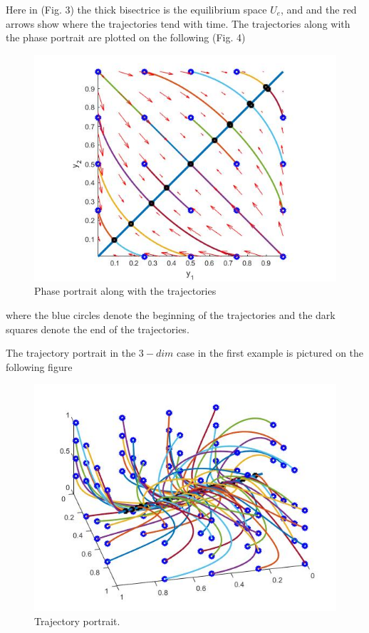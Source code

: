 \documentclass[a4paper,10pt, english]{article}
\begin{document}
Here in  (Fig. 3) the thick bisectrice is the equilibrium space $U_e$, and and the red arrows show where the trajectories tend with time.
The trajectories along with the phase portrait are plotted on the following (Fig. 4)
\begin{figure}[ht]
\label{fig_c4}
\centering
\includegraphics[scale= 0.4]{4.jpg}
\caption{Phase portrait along with the trajectories}
\end{figure}
where the blue circles denote the beginning of the trajectories and the dark squares denote the end of the trajectories.

The trajectory portrait in the $3-dim$ case in the first example is pictured on the following figure

\begin{figure}[ht]
\label{fig_c4}
\centering
\includegraphics[scale= 0.4]{5.jpg}
\caption{Trajectory portrait.}
\end{figure}
\end{document}
